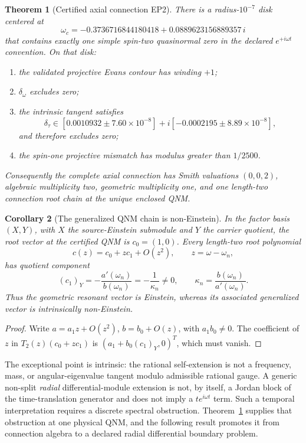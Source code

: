 \documentclass[11pt]{article}
\newtheorem{theorem}{Theorem}[section]
\newtheorem{corollary}[theorem]{Corollary}
\theoremstyle{definition}
\theoremstyle{remark}
\begin{document}
\begin{theorem}[Certified axial connection EP2]
\label{thm:ep2}
There is a radius-\(10^{-7}\) disk centered at
\[
\omega_c
=-0.3736716844180418
+0.0889623156889357\,i
\]
that contains exactly one simple spin-two quasinormal zero in the declared
\(e^{+i\omega t}\) convention.  On that disk:
\begin{enumerate}
\item the validated projective Evans contour has winding \(+1\);
\item \(\delta_\omega\) excludes zero;
\item the intrinsic tangent satisfies
\[
\delta_\tau\in
[0.0010932\pm7.60\times10^{-8}]
+i[-0.0002195\pm8.89\times10^{-8}],
\]
and therefore excludes zero;
\item the spin-one projective mismatch has modulus greater than \(1/2500\).
\end{enumerate}
Consequently the complete axial connection has Smith valuations
\((0,0,2)\), algebraic multiplicity two, geometric multiplicity one, and one
length-two connection root chain at the unique enclosed QNM.
\end{theorem}

\begin{corollary}[The generalized QNM chain is non-Einstein]
\label{cor:non-einstein-root-chain}
In the factor basis \((X,Y)\), with \(X\) the source-Einstein submodule and
\(Y\) the carrier quotient, the root vector at the certified QNM is
\(c_0=(1,0)\).  Every length-two root polynomial
\[
c(z)=c_0+zc_1+O(z^2),\qquad z=\omega-\omega_n,
\]
has quotient component
\[
(c_1)_Y=-\frac{a'(\omega_n)}{b(\omega_n)}
=-\frac1{\kappa_n}\ne0,
\qquad
\kappa_n=\frac{b(\omega_n)}{a'(\omega_n)}.
\]
Thus the geometric resonant vector is Einstein, whereas its associated
generalized vector is intrinsically non-Einstein.
\end{corollary}

\begin{proof}
Write \(a=a_1z+O(z^2)\), \(b=b_0+O(z)\), with \(a_1b_0\ne0\).
The coefficient of \(z\) in
\(T_2(z)(c_0+zc_1)\) is
\((a_1+b_0(c_1)_Y,0)^T\), which must vanish.
\end{proof}

The exceptional point is intrinsic: the rational self-extension is not a
frequency, mass, or angular-eigenvalue tangent modulo admissible rational
gauge.  A generic non-split \emph{radial} differential-module extension is
not, by itself, a Jordan block of the time-translation generator and does
not imply a \(t e^{i\omega t}\) term.  Such a temporal interpretation
requires a discrete spectral obstruction.  Theorem~\ref{thm:ep2} supplies
that obstruction at one physical QNM, and the following result promotes it
from connection algebra to a declared radial differential boundary problem.
\end{document}
